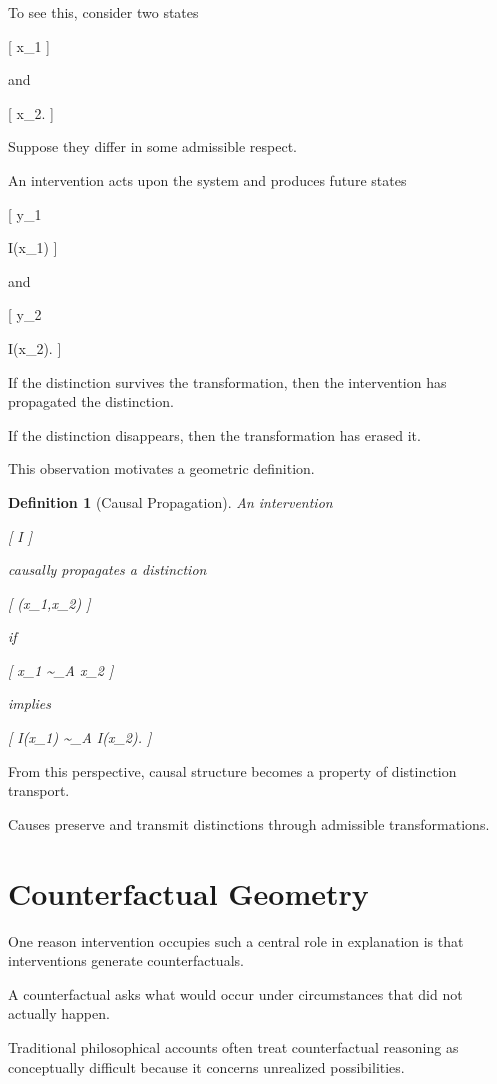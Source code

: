 \documentclass[11pt,oneside,openany]{book}
\newtheorem{definition}{Definition}[chapter] \newtheorem{theorem}{Theorem}[chapter] \newtheorem{proposition}{Proposition}[chapter] \newtheorem{lemma}{Lemma}[chapter] \newtheorem{corollary}{Corollary}[chapter] \newtheorem{remark}{Remark}[chapter]
\begin{document}
To see this, consider two states

[
x_1
]

and

[
x_2.
]

Suppose they differ in some admissible respect.

An intervention acts upon the system and produces future states

[
y_1

I(x_1)
]

and

[
y_2

I(x_2).
]

If the distinction survives the transformation, then the intervention has propagated the distinction.

If the distinction disappears, then the transformation has erased it.

This observation motivates a geometric definition.

\begin{definition}[Causal Propagation]

An intervention

[
I
]

causally propagates a distinction

[
(x_1,x_2)
]

if

[
x_1 \not\sim_A x_2
]

implies

[
I(x_1)
\not\sim_A
I(x_2).
]

\end{definition}

From this perspective, causal structure becomes a property of distinction transport.

Causes preserve and transmit distinctions through admissible transformations.

\section{Counterfactual Geometry}

One reason intervention occupies such a central role in explanation is that interventions generate counterfactuals.

A counterfactual asks what would occur under circumstances that did not actually happen.

Traditional philosophical accounts often treat counterfactual reasoning as conceptually difficult because it concerns unrealized possibilities.
\end{document}
